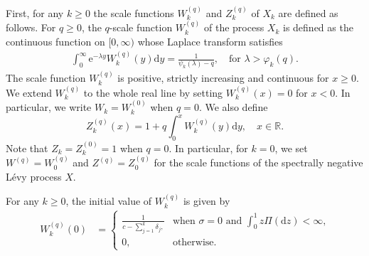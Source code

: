 \documentclass[12pt,reqno]{amsart}
\theoremstyle{definition}
\theoremstyle{remark}
\begin{document}
First, for any $k \geq 0$ the scale functions $W_k^{(q)}$ and $Z_k^{(q)}$ of $X_k$ are defined as follows.
For $q \geq 0$, the $q$-scale function $W_k^{(q)}$ of the process $X_k$ is defined as the continuous function on $[0,\infty)$ 
whose Laplace transform satisfies
\begin{align} \label{laplace_W_k}
\int_0^{\infty} \mathrm{e}^{- \lambda y} W_{k}^{(q)} (y) \mathrm{d}y = \frac{1}{\psi_k(\lambda)- q} ,
 \quad \text{for $\lambda > \varphi_{k}(q).$}
\end{align}
The scale function $W_k^{(q)}$ is positive, strictly increasing and continuous for $x\geq0$. 
We extend $W_k^{(q)}$ to the whole real line by setting $W_k^{(q)}(x)=0$ for $x<0$. In particular, we write $W_k = W_k^{(0)}$ when $q=0$. 
We also define
\begin{equation}\label{eq:zqscale}
Z_k^{(q)}(x) = 1 + q \int_0^x W_k^{(q)}(y)\mathrm d y, \quad x \in \mathbb R.
\end{equation}
Note that $Z_k = Z_k^{(0)}=1$ when $q=0$. 
In particular, for $k=0$, we set $W^{(q)}=W_0^{(q)}$ and $Z^{(q)}=Z_0^{(q)}$ for the scale functions of the spectrally negative L\'evy process $X$.

For any $k \geq 0$, the initial value of $W_k^{(q)}$ is given by
\begin{equation*}\label{initialvalues}
\begin{split}
W_k^{(q)}(0) &=
\begin{cases}
\frac{1}{c-\sum_{j=1}^k \delta_j,} & \text{when $\sigma=0$ and $\int_{0}^1 z \Pi(\mathrm{d}z) < \infty$,} \\
0, & \text{otherwise.}
\end{cases}
\end{split}
\end{equation*}
	
\end{document}
